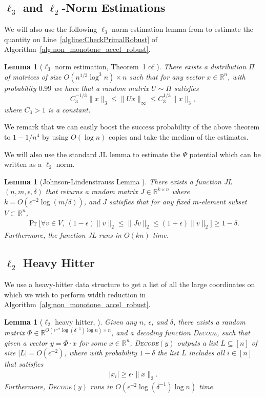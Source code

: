 \documentclass[11pt]{article}
\newtheorem{lemma}[theorem]{Lemma}
\newcommand\vv{\boldsymbol{\mathit{v}}}
\newcommand\yy{\boldsymbol{\mathit{y}}}
\newcommand\xx{\boldsymbol{\mathit{x}}}
\newcommand\JJ{\boldsymbol{\mathit{J}}}
\newcommand\UU{\boldsymbol{\mathit{U}}}
\newcommand\R{\mathbb{R}}
\begin{document}
\subsection{\texorpdfstring{$\ell_3$}{} and \texorpdfstring{$\ell_2$}{}-Norm Estimations}
We will also use the following $\ell_3$ norm estimation lemma from \cite{wz13} to estimate the quantity on Line~\ref{algline:CheckPrimalRobust} of Algorithm~\ref{alg:non_monotone_accel_robust}.
\begin{lemma}[$\ell_3$ norm estimation, Theorem~1 of \cite{wz13}]\label{lem:l3_norm_estimation}
There exists a distribution $\Pi$ of matrices of size $O(n^{1/3} \log^3 n) \times n$ such that for any vector $\xx \in \R^n$, with probability $0.99$ we have that a random matrix $\UU \sim \Pi$ satisfies
\[
C_3^{-1/3} \|\xx\|_3 \leq \|\UU \xx\|_{\infty} \leq C_3^{1/3} \|\xx\|_3,
\]
where $C_3 > 1$ is a constant.
\end{lemma}
We remark that we can easily boost the success probability of the above theorem to $1-1/n^4$ by using $O(\log n)$ copies and take the median of the estimates. 

We will also use the standard JL lemma to estimate the $\Psi$ potential which can be written as a $\ell_2$ norm. 
\begin{lemma}[Johnson-Lindenstrauss Lemma \cite{jl84}]\label{lem:JL}
There exists a function \textsc{JL}$(n,m,\epsilon, \delta)$ that returns a random matrix $\JJ \in \R^{k \times n}$ where $k = O(\epsilon^{-2} \log(m/\delta))$, and $\JJ$ satisfies that for any fixed $m$-element subset $V \subset \R^n$,
\begin{align*}
    \Pr\big[\forall \vv \in V, ~ (1 - \epsilon) \|\vv\|_2 \leq \|\JJ \vv\|_2 \leq (1 + \epsilon) \|\vv\|_2\big] \geq 1 - \delta.
\end{align*}
Furthermore, the function \textsc{JL} runs in $O(kn)$ time.
\end{lemma}


\subsection{\texorpdfstring{$\ell_2$}{} Heavy Hitter}
We use a heavy-hitter data structure to get a list of all the large coordinates on which we wish to perform width reduction in Algorithm~\ref{alg:non_monotone_accel_robust}.
\begin{lemma}[$\ell_2$ heavy hitter, \cite{knpw11,p13}]\label{lem:heavy_hitter}
Given any $n$, $\epsilon$, and $\delta$, there exists a random matrix $\Phi \in \R^{O(\epsilon^{-2} \log(\delta^{-1}) \log n) \times n}$, and a decoding function \textsc{Decode}, such that given a vector $\yy = \Phi \cdot \xx$ for some $\xx \in \R^n$, \textsc{Decode}$(\yy)$ outputs a list $L \subseteq [n]$ of size $|L| = O(\epsilon^{-2})$, where with probability $1-\delta$ the list $L$ includes all $i \in [n]$ that satisfies
    \begin{align*}
        |\xx_i| \geq \epsilon \cdot \|\xx\|_2.
    \end{align*}
Furthermore, \textsc{Decode}$(\yy)$ runs in $O(\epsilon^{-2} \log(\delta^{-1}) \log n)$ time.
\end{lemma}
\end{document}
